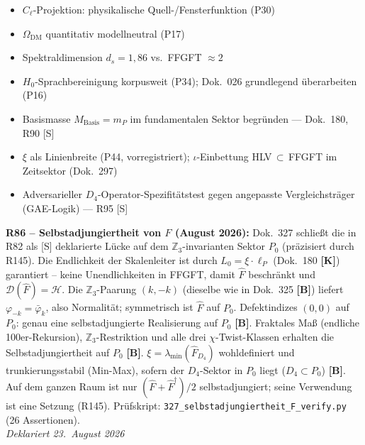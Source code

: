 \begin{itemize}
  \item $C_\ell$-Projektion: physikalische Quell-/Fensterfunktion (P30)
  \item $\Omega_{\mathrm{DM}}$ quantitativ modellneutral (P17)
  \item Spektraldimension $d_s = 1{,}86$ vs.\ FFGFT $\approx 2$
  \item $H_0$-Sprachbereinigung korpusweit (P34); Dok.~026 grundlegend \"uberarbeiten (P16)
  \item Basismasse $M_\mathrm{Basis} = m_P$ im fundamentalen Sektor begründen --- Dok.~180, R90 [S]
  \item $\xi$ als Linienbreite (P44, vorregistriert); $\iota$-Einbettung HLV$\,\subset\,$FFGFT im Zeitsektor (Dok.~297)
  \item Adversarieller $D_4$-Operator-Spezifitätstest gegen angepasste Vergleichsträger (GAE-Logik) --- R95 [S]
\end{itemize}
\textbf{R86 -- Selbstadjungiertheit von $\hat{F}$ (August 2026):}
Dok.~327 schließt die in R82 als [S] deklarierte Lücke auf dem $\mathbb{Z}_3$-invarianten Sektor $P_0$ (präzisiert durch R145).
Die Endlichkeit der Skalenleiter ist durch $L_0 = \xi\cdot\ell_P$
(Dok.~180 \textbf{[K]}) garantiert -- keine Unendlichkeiten in FFGFT,
damit $\hat{F}$ beschränkt und $\mathcal{D}(\hat{F}) = \mathcal{H}$.
Die $\mathbb{Z}_3$-Paarung $(k,-k)$ (dieselbe wie in Dok.~325 \textbf{[B]}) liefert
$\varphi_{-k}=\bar\varphi_k$, also Normalität; symmetrisch ist $\hat{F}$ auf $P_0$.
Defektindizes $(0,0)$ auf $P_0$: genau eine selbstadjungierte Realisierung auf $P_0$ \textbf{[B]}.
Fraktales Maß (endliche 100er-Rekursion), $\mathbb{Z}_3$-Restriktion
und alle drei $\chi$-Twist-Klassen erhalten die Selbstadjungiertheit auf $P_0$ \textbf{[B]}.
$\xi = \lambda_{\min}(\hat{F}_{D_4})$ wohldefiniert und trunkierungsstabil
(Min-Max), sofern der $D_4$-Sektor in $P_0$ liegt ($D_4 \subset P_0$) \textbf{[B]}.
Auf dem ganzen Raum ist nur $(\hat{F}+\hat{F}^\dagger)/2$ selbstadjungiert; seine Verwendung ist eine Setzung (R145).
Prüfskript: \texttt{327\_selbstadjungiertheit\_F\_verify.py} (26 Assertionen).\\
\emph{Deklariert 23.~August 2026}

\medskip

